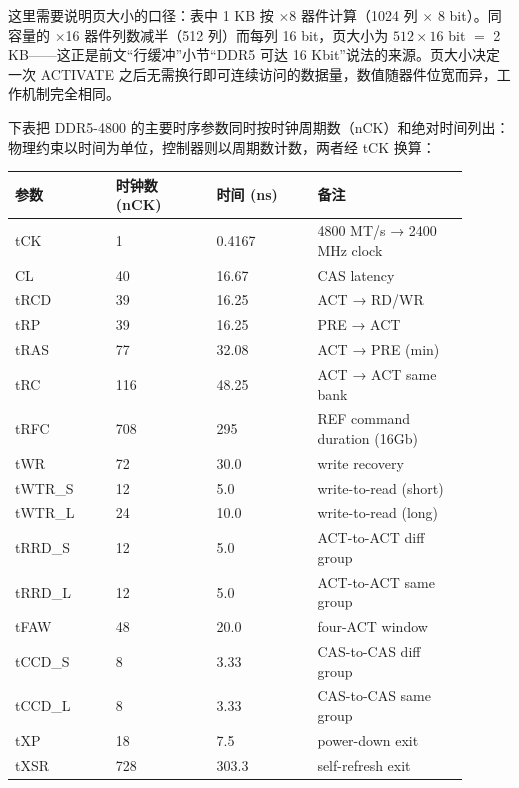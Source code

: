 这里需要说明页大小的口径：表中 1 KB 按 $\times$8 器件计算（1024 列 $\times$ 8 bit）。同容量的 $\times$16 器件列数减半（512 列）而每列 16 bit，页大小为 $512 \times 16$ bit $=$ 2 KB——这正是前文“行缓冲”小节“DDR5 可达 16 Kbit”说法的来源。页大小决定一次 ACTIVATE 之后无需换行即可连续访问的数据量，数值随器件位宽而异，工作机制完全相同。


下表把 DDR5-4800 的主要时序参数同时按时钟周期数（nCK）和绝对时间列出：物理约束以时间为单位，控制器则以周期数计数，两者经 tCK 换算：

\begin{longtable}{L{0.2\linewidth}L{0.2\linewidth}L{0.2\linewidth}L{0.3\linewidth}}
\toprule
参数 & 时钟数 (nCK) & 时间 (ns) & 备注 \\
\midrule
tCK & 1 & 0.4167 & 4800 MT/s → 2400 MHz clock \\
CL & 40 & 16.67 & CAS latency \\
tRCD & 39 & 16.25 & ACT → RD/WR \\
tRP & 39 & 16.25 & PRE → ACT \\
tRAS & 77 & 32.08 & ACT → PRE (min) \\
tRC & 116 & 48.25 & ACT → ACT same bank \\
tRFC & 708 & 295 & REF command duration (16Gb) \\
tWR & 72 & 30.0 & write recovery \\
tWTR\_S & 12 & 5.0 & write-to-read (short) \\
tWTR\_L & 24 & 10.0 & write-to-read (long) \\
tRRD\_S & 12 & 5.0 & ACT-to-ACT diff group \\
tRRD\_L & 12 & 5.0 & ACT-to-ACT same group \\
tFAW & 48 & 20.0 & four-ACT window \\
tCCD\_S & 8 & 3.33 & CAS-to-CAS diff group \\
tCCD\_L & 8 & 3.33 & CAS-to-CAS same group \\
tXP & 18 & 7.5 & power-down exit \\
tXSR & 728 & 303.3 & self-refresh exit \\
\bottomrule
\end{longtable}



